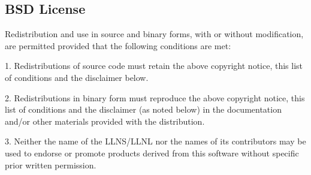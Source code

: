 \subsection{BSD License}
Redistribution and use in source and binary forms, with or without
modification, are permitted provided that the following conditions
are met:
 
1. Redistributions of source code must retain the above copyright
notice, this list of conditions and the disclaimer below.
 
2. Redistributions in binary form must reproduce the above copyright
notice, this list of conditions and the disclaimer (as noted below)
in the documentation and/or other materials provided with the
distribution.
 
3. Neither the name of the LLNS/LLNL nor the names of its contributors
may be used to endorse or promote products derived from this software
without specific prior written permission.
 
